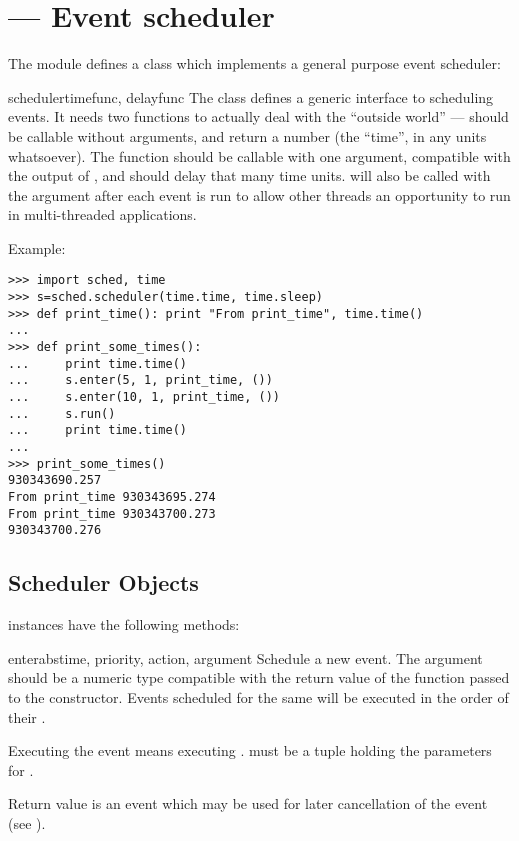\section{ ---
         Event scheduler}



The  module defines a class which implements a general
purpose event scheduler:

\begin{classdesc}{scheduler}{timefunc, delayfunc}
The  class defines a generic interface to scheduling
events. It needs two functions to actually deal with the ``outside world''
---  should be callable without arguments, and return 
a number (the ``time'', in any units whatsoever).  The 
function should be callable with one argument, compatible with the output
of , and should delay that many time units.
 will also be called with the argument  after
each event is run to allow other threads an opportunity to run in
multi-threaded applications.
\end{classdesc}

Example:

\begin{verbatim}
>>> import sched, time
>>> s=sched.scheduler(time.time, time.sleep)
>>> def print_time(): print "From print_time", time.time()
...
>>> def print_some_times():
...     print time.time()
...     s.enter(5, 1, print_time, ())
...     s.enter(10, 1, print_time, ())
...     s.run()
...     print time.time()
...
>>> print_some_times()
930343690.257
From print_time 930343695.274
From print_time 930343700.273
930343700.276
\end{verbatim}


\subsection{Scheduler Objects \label{scheduler-objects}}

 instances have the following methods:

\begin{methoddesc}{enterabs}{time, priority, action, argument}
Schedule a new event. The  argument should be a numeric type
compatible with the return value of the  function passed 
to the constructor. Events scheduled for
the same  will be executed in the order of their
.

Executing the event means executing .   must be a tuple holding the
parameters for .

Return value is an event which may be used for later cancellation of
the event (see ).
\end{methoddesc}


